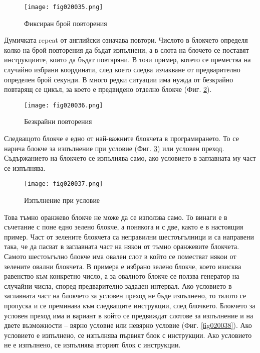 \begin{figure}[H]
  \centering
  \texttt{[image: fig020035.png]}
  \caption{Фиксиран брой повторения}
\label{fig020035}
\end{figure}

Думичката repeat от английски означава повтори. Числото в блокчето определя колко на брой повторения да бъдат изпълнени, а в слота на блочето се поставят инструкциите, които да бъдат повтаряни. В този пример, котето се премества на случайно избрани координати, след което следва изчакване от предварително определен брой секунди. В много редки ситуации има нужда от безкрайно повтарящ се цикъл, за което е предвидено отделно блокче (Фиг. \ref{fig020036}).

\begin{figure}[H]
  \centering
  \texttt{[image: fig020036.png]}
  \caption{Безкрайни повторения}
\label{fig020036}
\end{figure}

Следващото блокче е едно от най-важните блокчета в програмирането. То се нарича блокче за изпълнение при условие (Фиг. \ref{fig020037}) или условен преход. Съдържанието на блокчето се изпълнява само, ако условието в заглавната му част се изпълнява.

\begin{figure}[H]
  \centering
  \texttt{[image: fig020037.png]}
  \caption{Изпълнение при условие}
\label{fig020037}
\end{figure}

Това тъмно оранжево блокче не може да се използва само. То винаги е в съчетание с поне едно зелено блокче, а понякога и с две, както е в настоящия пример. Част от зелените блокчета са неправилни шестоъгълници и са направени така, че да пасват в заглавната част на някои от тъмно оранжевите блокчета. Самото шестоъгълно блокче има овален слот в който се поместват някои от зелените овални блокчета. В примера е избрано зелено блокче, което изисква равенство към конкретно число, а за овалното блокче се ползва генератор на случайни числа, според предварително зададен интервал. Ако условието в заглавната част на блокчето за условен преход не бъде изпълнено, то тялото се пропуска и се преминава към следващите инструкции, след блочкето. Блокчето за условен преход има и вариант в който се предвиждат слотове за изпълнение и на двете възможности – вярно условие или невярно условие (Фиг. \ref{fig020038}). Ако условието е изпълнено, се изпълнява първият блок с инструкции. Ако условието не е изпълнено, се изпълнява вторият блок с инструкции.

